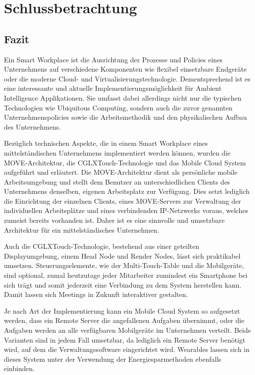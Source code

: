 \newpage
\section{Schlussbetrachtung}
\subsection{Fazit}
Ein Smart Workplace ist die Ausrichtung der Prozesse und Policies eines Unternehmens auf verschiedene Komponenten wie flexibel einsetzbare Endgeräte oder die moderne Cloud- und Virtualisierungstechnologie. Dementsprechend ist es eine interessante und aktuelle Implementierungsmöglichkeit für Ambient Intelligence Applikationen. Sie umfasst dabei allerdings nicht nur die typischen Technologien wie Ubiquitous Computing, sondern auch die zuvor genannten Unternehmenspolicies sowie die Arbeitsmethodik und den physikalischen Aufbau des Unternehmens.

Bezüglich technischen Aspekte, die in einem Smart Workplace eines mittelständischen Unternehmens implementiert werden können, wurden die MOVE-Architektur, die CGLXTouch-Technologie und das Mobile Cloud System aufgeführt und erläutert. Die MOVE-Architektur dient als persönliche mobile Arbeitsumgebung und stellt dem Benutzer an unterschiedlichen Clients des Unternehmens denselben, eigenen Arbeitsplatz zur Verfügung. Dies setzt lediglich die Einrichtung der einzelnen Clients, eines MOVE-Servers zur Verwaltung der individuellen Arbeitsplätze und eines verbindenden IP-Netzwerks voraus, welches zumeist bereits vorhanden ist. Daher ist es eine sinnvolle und umsetzbare Architektur für ein mittelständisches Unternehmen.

Auch die CGLXTouch-Technologie, bestehend aus einer geteilten Displayumgebung, einem Head Node und Render Nodes, lässt sich praktikabel umsetzen. Steuerungselemente, wie der Multi-Touch-Table und die Mobilgeräte, sind optional, zumal heutzutage jeder Mitarbeiter zumindest ein Smartphone bei sich trägt und somit jederzeit eine Verbindung zu dem System herstellen kann.
Damit lassen sich Meetings in Zukunft interaktiver gestalten.

Je nach Art der Implementierung kann ein Mobile Cloud System so aufgesetzt werden, dass ein Remote Server die angefallenen Aufgaben übernimmt, oder die Aufgaben werden an alle verfügbaren Mobilgeräte im Unternehmen verteilt. Beide Varianten sind in jedem Fall umsetzbar, da lediglich ein Remote Server benötigt wird, auf dem die Verwaltungssoftware eingerichtet wird.
Wearables lassen sich in dieses System unter der Verwendung der Energiesparmethoden ebenfalls einbinden.

